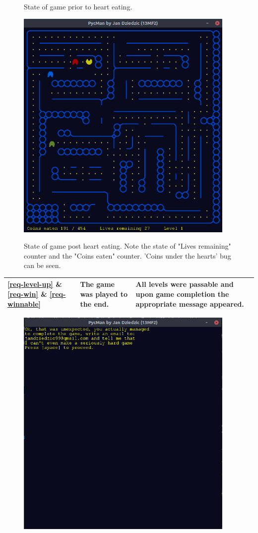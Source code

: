 \documentclass[11pt,a4paper,notitlepage]{report}
\newenvironment{img}{
	\begin{center}
		\begin{figure}[H]
			\begin{center}
			
}{
	\end{center}
		\end{figure}
			\end{center}
}
\begin{document}
\begin{center}
\begin{img}
					\caption{State of game prior to heart eating.}
				\end{img}
				\begin{img}
					\includegraphics[width=300pt]{images/hearts-working1.png}\\
					\caption{State of game post heart eating. Note the state of "Lives remaining" counter and the "Coins eaten" counter. 'Coins under the hearts' bug can be seen.}
					\label{coins-under-hearts}
				\end{img}
				\begin{longtable}{ | p{2cm} | p{5cm} | p{4cm} |}
					\hline	
					\ref{req-level-up} \& \ref{req-win} \& \ref{req-winnable}&The game was played to the end.&All levels were passable and upon game completion the appropriate message appeared.\\ \hline
				\end{longtable}
				\begin{img}
					\includegraphics[width=300pt]{images/real_congrats_msg.png}\\

\end{img}
\end{center}
\end{document}
